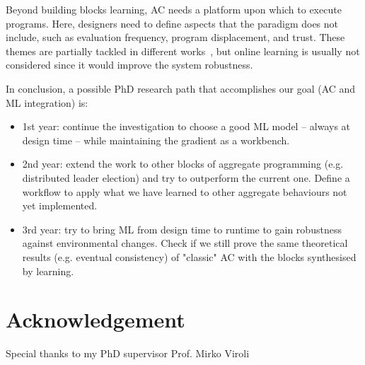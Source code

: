 \documentclass[conference]{IEEEtran}
\begin{document}
Beyond building blocks learning, AC needs a platform upon which to execute programs. 
%
Here, designers need to define aspects that the paradigm does not include, such as evaluation frequency, program displacement, and trust.
% 
These themes are partially tackled in different works~\cite{DBLP:journals/scp/CasadeiAV18, DBLP:journals/fi/CasadeiPPVW20, DBLP:journals/corr/abs-2012-13806}, but online learning is usually not considered since it would improve the system robustness.

%
%
In conclusion, a possible PhD research path that accomplishes our goal (AC and ML integration) is:
\begin{itemize}
    \item 1st year: continue the investigation to choose a good ML model -- always at design time -- while maintaining the gradient as a workbench.
    \item 2nd year: extend the work to other blocks of aggregate programming (e.g. distributed leader election) and try to outperform the current one. Define a workflow to apply what we have learned to other aggregate behaviours not yet implemented.
    \item 3rd year: try to bring ML from design time to runtime to gain robustness against environmental changes. Check if we still prove the same theoretical results (e.g. eventual consistency) of "classic" AC with the blocks synthesised by learning.
\end{itemize}
\section*{Acknowledgement}
Special thanks to my PhD supervisor Prof. Mirko Viroli


\end{document}
